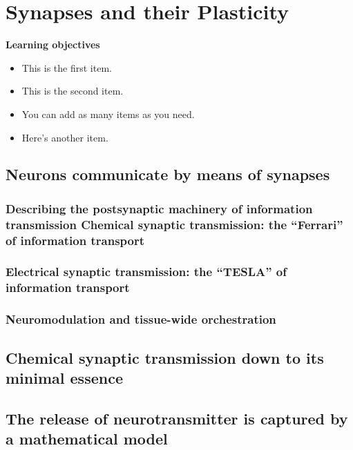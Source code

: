 \chapter{Synapses and their Plasticity}
\label{syn} %


\vspace{2cm} %

\begin{svgraybox}
{\bf{Learning objectives}}
\begin{itemize}
	\item This is the first item.
	\item This is the second item.
	\item You can add as many items as you need.
	\item Here's another item.
  \end{itemize}
\end{svgraybox}

\clearpage


\section{Neurons communicate by means of synapses}
	\subsection{Describing the postsynaptic machinery of information transmission Chemical synaptic transmission: the “Ferrari” of information transport}
	\subsection{Electrical synaptic transmission: the “TESLA” of information transport}
	\subsection{Neuromodulation and tissue-wide orchestration}
	\section{Chemical synaptic transmission down to its minimal essence}
	\section{The release of neurotransmitter is captured by a mathematical model }
